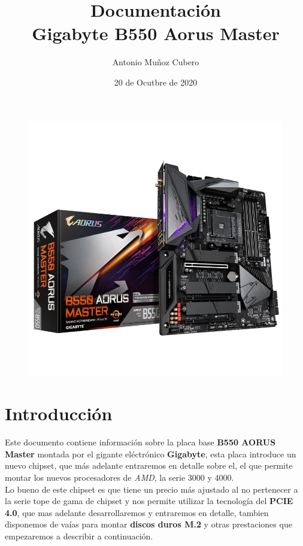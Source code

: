 \documentclass{article}
\title{Documentación \\\large \textbf{Gigabyte B550 Aorus Master}}
\author{Antonio Muñoz Cubero}
\date{20 de Ocutbre de 2020}
\begin{document}
\maketitle
{}

\begin{figure}[h]
  \centering
  \includegraphics[scale = 0.5]{img/portada.png}
\end{figure}

\pagestyle{fancy} 

\newpage
\tableofcontents
{}


\section{Introducción}
Este documento contiene información sobre la placa base \textbf{B550 AORUS Master} montada por el gigante eléctrónico \textbf{Gigabyte}, esta placa introduce un nuevo chipset, que más adelante entraremos en detalle sobre el, 
el  
que permite montar los nuevos procesadores de \textit{AMD}, la serie 3000 y 4000.\\
Lo bueno de este chipset es que tiene un precio más ajustado al no pertenecer a la serie tope de gama de chipset y nos permite utilizar la tecnología del \textbf{PCIE 4.0}, que mas adelante desarrollaremos y entraremos en 
detalle, tambien 
disponemos de vaías para montar \textbf{discos duros M.2} y otras prestaciones que empezaremos a describir a continuación.
\end{document}
